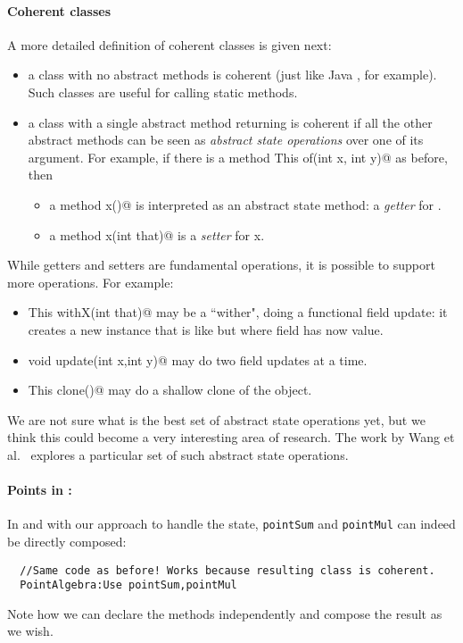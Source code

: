 \paragraph{Coherent classes} A more detailed definition of coherent
classes is given next:
\begin{itemize}
\item a class with no abstract methods is coherent (just like Java
  \Q@Math@, for example). Such classes are useful for calling static methods.
\item a class with a single abstract \Q@static@ method returning \Q@This@
is coherent if all the other abstract methods can be seen as \emph{abstract state
operations} over one of its argument.
For example,
if there is a \Q@static method This of(int x, int y)@ as before,
then
\begin{itemize}
\item a method \Q@int x()@ is interpreted as an abstract state method: a \emph{getter} for \Q@x@.
\item a method \Q@void x(int that)@ is a \emph{setter} for x.
\end{itemize}
\end{itemize}
\noindent
While getters and setters are fundamental operations, it is possible to
support more operations. For example:
\begin{itemize}
\item \Q@method This withX(int that)@
may be a ``wither", doing a functional field update: it creates a new instance that is like \Q@this@ but where field \Q@x@ has now \Q@that@ value.
\item \Q@method void update(int x,int y)@
may do two field updates at a time.
\item\Q@method This clone()@ may do a shallow clone of the object.
\end{itemize}

We are not sure what is the best set of abstract state operations yet,
but we think this could become a very interesting area of research.
The work by Wang et al.~\cite{wang2016classless} explores a particular
set of such abstract state operations.

\paragraph{Points in \name:}
In \name and with our approach to handle the state, 
\lstinline{pointSum} and \lstinline{pointMul} can indeed be directly composed:
\saveSpace
\begin{lstlisting}
  //Same code as before! Works because resulting class is coherent.
  PointAlgebra:Use pointSum,pointMul 
\end{lstlisting}  
\saveSpace
\noindent
  Note how we can declare the methods independently and compose the result
  as we wish. 

